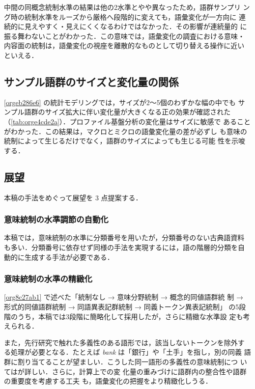 \documentclass[submit]{ipsj}
\renewcommand{\ref}{\cref}
\begin{document}
中間の同概念統制水準の結果は他の2水準とやや異なったため，語群サンプリ
ング時の統制水準をルーズから厳格へ段階的に変えても，語彙変化が一方向に
連続的に見えやすく・見えにくくなるわけではなかった．その影響が連続量的
に振る舞わないことがわかった．この意味では，語彙変化の調査における意味・
内容面の統制は，語彙変化の視座を離散的なものとして切り替える操作に近い
といえる．
\subsection{サンプル語群のサイズと変化量の関係\label{org2e2acee}}
\label{sec:orga18bad9}
\ref{orgeb286e6} の統計モデリングでは，サイズが2〜5個のわずかな幅の中でも
サンプル語群のサイズ拡大に伴い変化量が大きくなる正の効果が確認された
（\ref{tab:orge4cde2a}）．プロファイル基盤分析の変化量はサイズに敏感で
あることがわかった．この結果は，マクロとミクロの語彙変化量の差が必ずし
も意味の統制によって生じるだけでなく，語群のサイズによっても生じる可能
性を示唆する．
\subsection{展望\label{org905cbab}}
\label{sec:orgcfa291d}
本稿の手法をめぐって展望を 3 点提案する．
\subsubsection{意味統制の水準調節の自動化\label{orge3fde24}}
\label{sec:org2acd5f2}
本稿では，意味統制の水準に分類番号を用いたが，分類番号のない古典語資料
も多い．分類番号に依存せず同様の手法を実現するには，語の階層的分類を自
動的に生成する手法が必要である．
\subsubsection{意味統制の水準の精緻化\label{org7dcb24b}}
\label{sec:org7c3f13d}
\ref{org8c27ab1} で述べた「統制なし → 意味分野統制 → 概念的同値語群統
制 → 形式的同値語群統制 → 同語異表記群統制 → 同義トークン異表記統制」
の5段階のうち，本稿では3段階に簡略化して採用したが，さらに精緻な水準設
定も考えられる．

また，先行研究で触れた多義性のある語形では，該当しないトークンを除外す
る処理が必要となる．たとえば \emph{bank} は「銀行」や「土手」を指し，別の同義
語群に割り当てることが望ましい．こうした同一語形の多義性の意味統制につ
いては\cite{DePascale2021Scoring}が詳しい．さらに，計算上での変
化量の重みづけに語群内の整合性や語群の重要度を考慮する工夫
\cite{Ruette2014Semantic} も，語彙変化の把握をより精緻化しうる．
\end{document}
